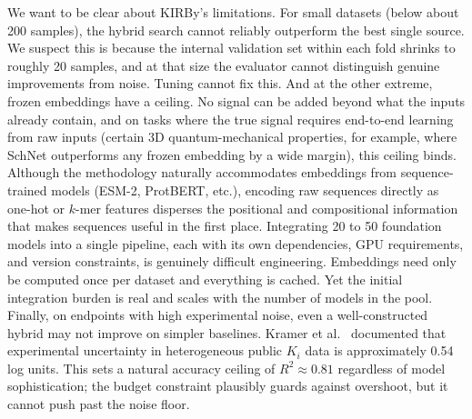 We want to be clear about KIRBy's limitations. For small datasets (below about 200 samples), the hybrid search cannot reliably outperform the best single source. We suspect this is because the internal validation set within each fold shrinks to roughly 20 samples, and at that size the evaluator cannot distinguish genuine improvements from noise. Tuning cannot fix this. And at the other extreme, frozen embeddings have a ceiling. No signal can be added beyond what the inputs already contain, and on tasks where the true signal requires end-to-end learning from raw inputs (certain 3D quantum-mechanical properties, for example, where SchNet outperforms any frozen embedding by a wide margin), this ceiling binds. Although the methodology naturally accommodates embeddings from sequence-trained models (ESM-2, ProtBERT, etc.), encoding raw sequences directly as one-hot or $k$-mer features disperses the positional and compositional information that makes sequences useful in the first place. Integrating 20 to 50 foundation models into a single pipeline, each with its own dependencies, GPU requirements, and version constraints, is genuinely difficult engineering. Embeddings need only be computed once per dataset and everything is cached. Yet the initial integration burden is real and scales with the number of models in the pool. Finally, on endpoints with high experimental noise, even a well-constructed hybrid may not improve on simpler baselines. Kramer et al.\ \citep{Kramer2012} documented that experimental uncertainty in heterogeneous public $K_i$ data is approximately 0.54 log units. This sets a natural accuracy ceiling of $R^2 \approx 0.81$ regardless of model sophistication; the budget constraint plausibly guards against overshoot, but it cannot push past the noise floor.


